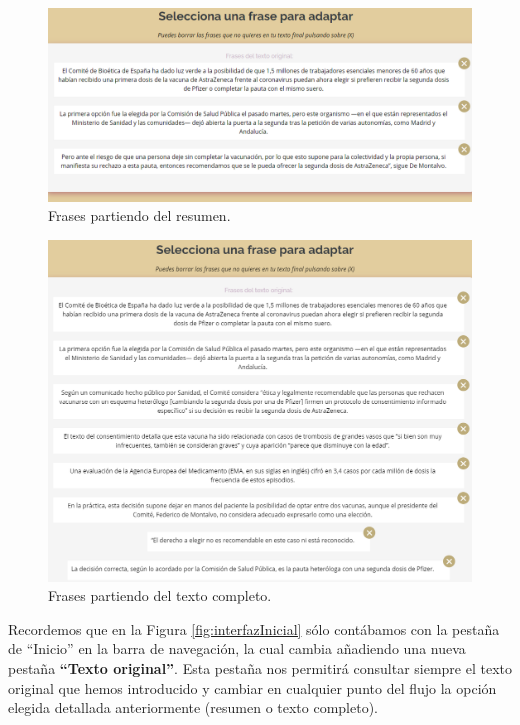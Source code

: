 \begin{itemize}
\begin{figure}[h!]
 	 	 	
 	 	 	\includegraphics[scale=0.7]{Imagenes/Figuras/Resumen}
 	 	 	
 	 	 	
 	 	 	\caption{Frases partiendo del resumen.}
 	 	 	\label{fig:interfazFraseTextoResumido}
 	 	 \end{figure}
 	 	 
 	 	 
 	 	 \begin{figure}[h!]
 	 	 	\centering
 	 	 	
 	 	 	
 	 	 	\includegraphics[scale=0.7]{Imagenes/Figuras/TextoCompleto}
 	 	 	
 	 	 	
 	 	 	\caption{Frases partiendo del texto completo.}
 	 	 	\label{fig:interfazIntroducirCompleto}
 	 	 \end{figure}	
 \end{itemize}

	Recordemos que en la Figura \ref{fig:interfazInicial} sólo contábamos con la pestaña de ``Inicio'' en la barra de navegación, la cual cambia añadiendo una nueva pestaña \textbf{``Texto original''}. Esta pestaña nos permitirá consultar siempre el texto original que hemos introducido y cambiar en cualquier punto del flujo la opción elegida detallada anteriormente (resumen o texto completo). 


